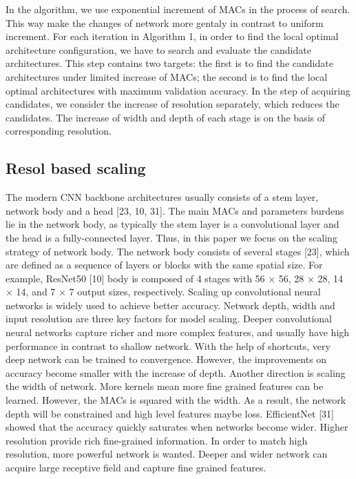 In the algorithm, we use exponential increment of MACs in the process of search. 
This way make the changes of network more gentaly in contrast to uniform increment. 
For each iteration in Algorithm 1, in order to find the local optimal architecture configuration, 
we have to search and evaluate the candidate architectures. 
This step contains two targets: the first is to find the candidate architectures under limited increase of MACs; 
the second is to find the local optimal architectures with maximum validation accuracy. 
In the step of acquiring candidates, we consider the increase of resolution separately, which reduces the candidates. 
The increase of width and depth of each stage is on the basis of corresponding resolution.

\subsection{Resol based scaling}

The modern CNN backbone architectures usually consists of a stem layer, network body and a head [23, 10, 31]. The main MACs and parameters burdens lie in the network body, as typically the stem layer is a convolutional layer and the head is a fully-connected layer. Thus, in this paper we focus on the scaling strategy of network body. The network body consists of several stages [23], which are defined as a sequence of layers or blocks with the same spatial size. For example, ResNet50 [10] body is composed of 4 stages with 56 × 56, 28 × 28, 14 × 14, and 7 × 7 output sizes, respectively.
Scaling up convolutional neural networks is widely used to achieve better accuracy. Network depth, width and input resolution are three key factors for model scaling. Deeper convolutional neural networks capture richer and more complex features, and usually have high performance in contrast to shallow network. With the help of shortcuts, very deep network can be trained to convergence. However, the improvements on accuracy become smaller with the increase of depth. Another direction is scaling the width of network. More kernels mean more fine grained features can be learned. However, the MACs is squared with the width. As a result, the network depth will be constrained and high level features maybe loss. EfficientNet [31] showed that the accuracy quickly saturates when networks become wider. Higher resolution provide rich fine-grained information. In order to match high resolution, more powerful network is wanted. Deeper and wider network can acquire large receptive field and capture fine grained features.

